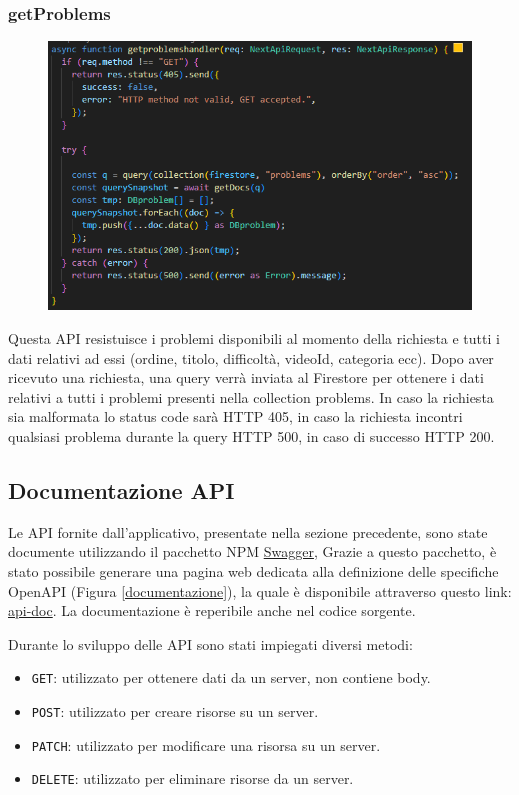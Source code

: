 \documentclass[11pt, a4paper]{article}
\theoremstyle{definition}
\begin{document}
\subsubsection{getProblems}
\begin{figure}[H]
  \centering
  \includegraphics[width=\textwidth]{materiale/API/GetProblems.png}
\end{figure}
Questa API resistuisce i problemi disponibili al momento della richiesta e tutti i dati relativi ad essi (ordine, titolo, difficoltà, videoId, categoria ecc).
Dopo aver ricevuto una richiesta, una query verrà inviata al Firestore per ottenere i dati relativi a tutti i problemi presenti nella collection problems.
In caso la richiesta sia malformata lo status code sarà HTTP 405, in caso la richiesta incontri qualsiasi problema durante la query HTTP 500, in caso di successo HTTP 200.
\newpage
\subsection{Documentazione API}
Le API fornite dall'applicativo, presentate nella sezione precedente, sono state documente utilizzando il pacchetto NPM \href{https://www.npmjs.com/package/swagger}{Swagger},
Grazie a questo pacchetto, è stato possibile generare una pagina web dedicata alla definizione delle specifiche OpenAPI (Figura \ref{documentazione}), la quale è disponibile attraverso questo link: \href{https://sleepcode-dev.vercel.app/api-doc}{api-doc}.
La documentazione è reperibile anche nel codice sorgente.

Durante lo sviluppo delle API sono stati impiegati diversi metodi:
\begin{itemize}
  \item \texttt{GET}: utilizzato per ottenere dati da un server, non contiene body.
  \item \texttt{POST}: utilizzato per creare risorse su un server.
  \item \texttt{PATCH}: utilizzato per modificare una risorsa su un server.
  \item \texttt{DELETE}: utilizzato per eliminare risorse da un server.
\end{itemize}
\end{document}
